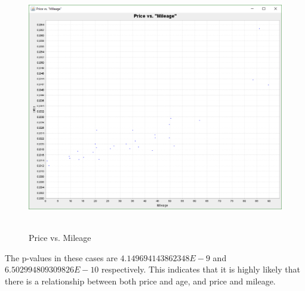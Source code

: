 	\begin{figure}[h]
		\centering
		\includegraphics[width=1\textwidth]{Figures/price_vs_mileage}~\\
		\caption{Price vs. Mileage}
		\label{fig:price_vs_mileage}
	\end{figure}
	
	The p-values in these cases are $4.149694143862348E-9$ and $6.502994809309826E-10$ respectively. This indicates that it is highly likely that there is a relationship between both price and age, and price and mileage.